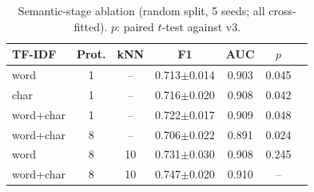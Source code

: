 \begin{table}[t]
\centering
\caption{Semantic-stage ablation (random split, 5 seeds; all cross-fitted). $p$: paired $t$-test against v3.}
\label{tab:ablation}
\small
\setlength{\tabcolsep}{3.5pt}
\begin{tabular}{lcccccc}
\toprule
\textbf{TF-IDF} & \textbf{Prot.} & \textbf{kNN} & \textbf{F1} & \textbf{AUC} & $p$ \\
\midrule
word & 1 & -- & 0.713$\pm$0.014 & 0.903 & 0.045 \\
char & 1 & -- & 0.716$\pm$0.020 & 0.908 & 0.042 \\
word+char & 1 & -- & 0.722$\pm$0.017 & 0.909 & 0.048 \\
word+char & 8 & -- & 0.706$\pm$0.022 & 0.891 & 0.024 \\
word & 8 & 10 & 0.731$\pm$0.030 & 0.908 & 0.245 \\
word+char & 8 & 10 & 0.747$\pm$0.020 & 0.910 & -- \\
\bottomrule
\end{tabular}
\end{table}
